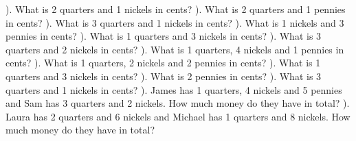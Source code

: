 \documentclass{article}%
\begin{document}
\newline%
). What is 2 quarters and 1 nickels in cents?%
\newline%
\newline%
). What is 2 quarters and 1 pennies in cents?%
\newline%
\newline%
). What is 3 quarters and 1 nickels in cents?%
\newline%
\newline%
). What is 1 nickels and 3 pennies in cents?%
\newline%
\newline%
). What is 1 quarters and 3 nickels in cents?%
\newline%
\newline%
). What is 3 quarters and 2 nickels in cents?%
\newline%
\newline%
). What is 1 quarters, 4 nickels and 1 pennies in cents?%
\newline%
\newline%
). What is 1 quarters, 2 nickels and 2 pennies in cents?%
\newline%
\newline%
). What is 1 quarters and 3 nickels in cents?%
\newline%
\newline%
). What is 2 pennies in cents?%
\newline%
\newline%
). What is 3 quarters and 1 nickels in cents?%
\newline%
\newline%
). James has 1 quarters, 4 nickels and 5 pennies and Sam has 3 quarters and 2 nickels. How much money do they have in total?%
\newline%
\newline%
). Laura has 2 quarters and 6 nickels and Michael has 1 quarters and 8 nickels. How much money do they have in total?%
\end{document}
